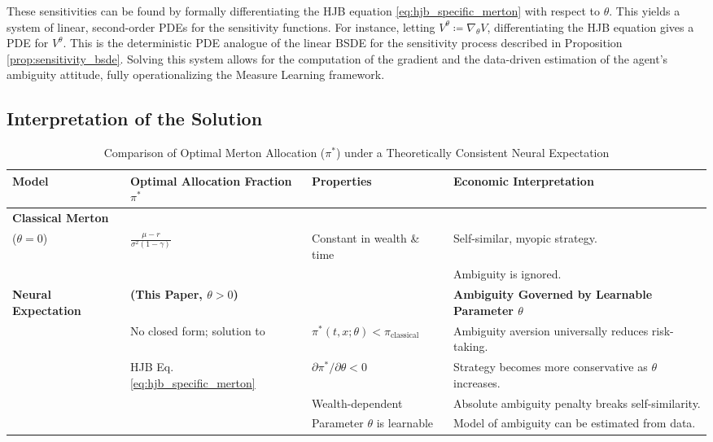 \documentclass[qian]{imsart}
\theoremstyle{plain}
\theoremstyle{definition}
\begin{document}
These sensitivities can be found by formally differentiating the HJB equation \eqref{eq:hjb_specific_merton} with respect to $\theta$. This yields a system of linear, second-order PDEs for the sensitivity functions. For instance, letting $V^\theta \coloneqq \nabla_\theta V$, differentiating the HJB equation gives a PDE for $V^\theta$. This is the deterministic PDE analogue of the linear BSDE for the sensitivity process described in Proposition \ref{prop:sensitivity_bsde}. Solving this system allows for the computation of the gradient and the data-driven estimation of the agent's ambiguity attitude, fully operationalizing the Measure Learning framework.

\subsection{Interpretation of the Solution}

\begin{table}[h!]
\centering
\caption{Comparison of Optimal Merton Allocation ($\pi^*$) under a Theoretically Consistent Neural Expectation}
\label{tab:merton_summary}
\begin{adjustbox}{max width=\textwidth}
\begin{tabular}{@{}llll@{}}
\toprule
\textbf{Model} & \textbf{Optimal Allocation Fraction $\pi^*$} & \textbf{Properties} & \textbf{Economic Interpretation} \\
\midrule
\textbf{Classical Merton} & & & \\
($\theta=0$) & $\frac{\mu-r}{\sigma^2(1-\gamma)}$ & Constant in wealth \& time & Self-similar, myopic strategy. \\
& & & Ambiguity is ignored. \\
\addlinespace
\textbf{Neural Expectation} & \textbf{(This Paper, $\theta > 0$)} & & \textbf{Ambiguity Governed by Learnable Parameter $\theta$} \\
 & No closed form; solution to & $\pi^*(t,x; \theta) < \pi_{\text{classical}}$ & Ambiguity aversion universally reduces risk-taking. \\
 & HJB Eq. \eqref{eq:hjb_specific_merton} & $\partial \pi^* / \partial \theta < 0$ & Strategy becomes more conservative as $\theta$ increases. \\
 & & Wealth-dependent & Absolute ambiguity penalty breaks self-similarity. \\
 & & Parameter $\theta$ is learnable & Model of ambiguity can be estimated from data. \\
\bottomrule
\end{tabular}
\end{adjustbox}
\end{table}
\end{document}

